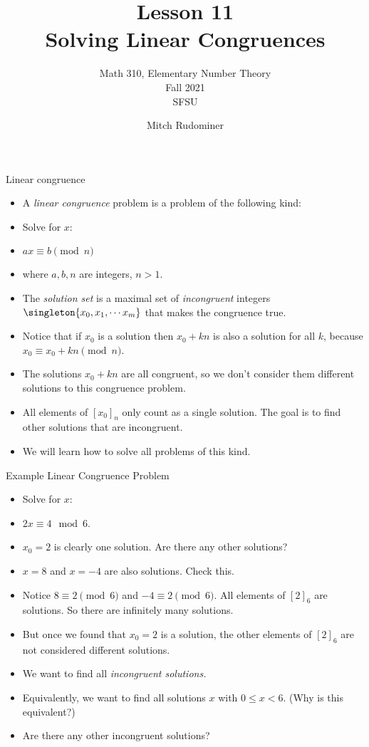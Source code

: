 \documentclass{beamer}
\title{Lesson 11 \\ Solving Linear Congruences}
\subtitle{Math 310, Elementary Number Theory \\ Fall 2021 \\ SFSU}
\author{Mitch Rudominer}
\date{}
\begin{document}
\begin{frame}
  \titlepage
\end{frame}

\begin{frame}{Linear congruence}
\begin{itemize}
  \item A \emph{linear congruence} problem is a problem of the following kind:
  \item Solve for $x$:
  \item $ax \equiv b \pmod n$
  \item where $a,b,n$ are integers,  $n>1$.
  \item The \emph{solution set} is a maximal set of \emph{incongruent} integers $\singleton{x_0,x_1,\cdots x_m}$ that makes the congruence true.
  \item Notice that if $x_0$ is a solution then $x_0+kn$ is also a solution for all $k$, because $x_0\equiv x_0+kn \pmod n$.
  \item The solutions $x_0+kn$ are all congruent, so we don't consider them different solutions to this congruence problem.
  \item All elements of $[x_0]_n$ only count as a single solution. The goal is to find other solutions that are incongruent.
  \item We will learn how to solve all problems of this kind.
\end{itemize}
\end{frame}


\begin{frame}{Example Linear Congruence Problem}

\begin{itemize}
  \item Solve for $x$:
  \item $2x  \equiv 4 \mod 6$.
  \item $x_0=2$ is clearly one solution. Are there any other solutions?
  \item $x=8$ and $x=-4$ are also solutions. Check this.
  \item Notice $8\equiv 2 \pmod 6$ and $-4\equiv 2\pmod 6$. All elements of $[2]_6$ are solutions. So there are infinitely many solutions.
  \item But once we found that $x_0=2$ is a solution, the other elements of $[2]_6$ are not considered different solutions.
  \item We want to find all \emph{incongruent solutions.}
  \item Equivalently, we want to find all solutions $x$ with $0\leq x < 6$. (Why is this equivalent?)
  \item Are there any other incongruent solutions?
\end{itemize}

\end{frame}
\end{document}

